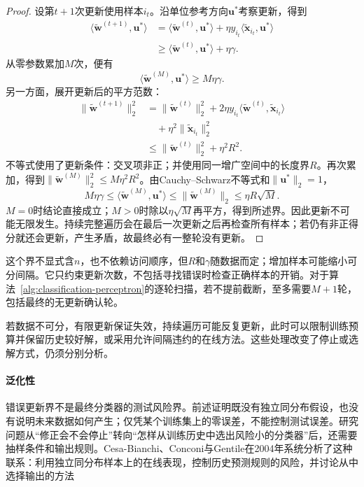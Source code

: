 \begin{proof}
  设第$t+1$次更新使用样本$i_t$。沿单位参考方向$\bm{u}^\ast$考察更新，得到
  \begin{align*}
    \langle\tilde{\bm{w}}^{(t+1)},\bm{u}^\ast\rangle
      &=\langle\tilde{\bm{w}}^{(t)},\bm{u}^\ast\rangle
        +\eta y_{i_t}\langle\tilde{\bm{x}}_{i_t},\bm{u}^\ast\rangle\\
      &\geq\langle\tilde{\bm{w}}^{(t)},\bm{u}^\ast\rangle+\eta\gamma .
  \end{align*}
  从零参数累加$M$次，便有
  \[
    \langle\tilde{\bm{w}}^{(M)},\bm{u}^\ast\rangle
      \geq M\eta\gamma .
  \]
  另一方面，展开更新后的平方范数：
  \begin{align*}
    \|\tilde{\bm{w}}^{(t+1)}\|_2^2
      &=\|\tilde{\bm{w}}^{(t)}\|_2^2
        +2\eta y_{i_t}
          \langle\tilde{\bm{w}}^{(t)},\tilde{\bm{x}}_{i_t}\rangle\\
      &\quad+\eta^2\|\tilde{\bm{x}}_{i_t}\|_2^2\\
      &\leq\|\tilde{\bm{w}}^{(t)}\|_2^2+\eta^2R^2 .
  \end{align*}
  不等式使用了更新条件：交叉项非正；并使用同一增广空间中的长度界$R$。再次累加，得到$\|\tilde{\bm{w}}^{(M)}\|_2^2\leq M\eta^2R^2$。由Cauchy--Schwarz不等式和$\|\bm{u}^\ast\|_2=1$，
  \[
    M\eta\gamma
      \leq\langle\tilde{\bm{w}}^{(M)},\bm{u}^\ast\rangle
      \leq\|\tilde{\bm{w}}^{(M)}\|_2
      \leq\eta R\sqrt{M}.
  \]
  $M=0$时结论直接成立；$M>0$时除以$\eta\sqrt M$再平方，得到所述界。因此更新不可能无限发生。持续完整遍历会在最后一次更新之后再检查所有样本；若仍有非正得分就还会更新，产生矛盾，故最终必有一整轮没有更新。
\end{proof}

这个界不显式含$n$，也不依赖访问顺序，但$R$和$\gamma$随数据而定；增加样本可能缩小可分间隔。它只约束更新次数，不包括寻找错误时检查正确样本的开销。对于算法~\ref{alg:classification-perceptron}的逐轮扫描，若不提前截断，至多需要$M+1$轮，包括最终的无更新确认轮。

若数据不可分，有限更新保证失效，持续遍历可能反复更新，此时可以限制训练预算并保留历史较好解，或采用允许间隔违约的在线方法。这些处理改变了停止或选解方式，仍须分别分析。

\paragraph{泛化性}
错误更新界不是最终分类器的测试风险界。前述证明既没有独立同分布假设，也没有说明未来数据如何产生；仅凭某个训练集上的零误差，不能控制测试误差。研究问题从“修正会不会停止”转向“怎样从训练历史中选出风险小的分类器”后，还需要抽样条件和输出规则。Cesa-Bianchi、Conconi与Gentile在2004年系统分析了这种联系：利用独立同分布样本上的在线表现，控制历史预测规则的风险，并讨论从中选择输出的方法

